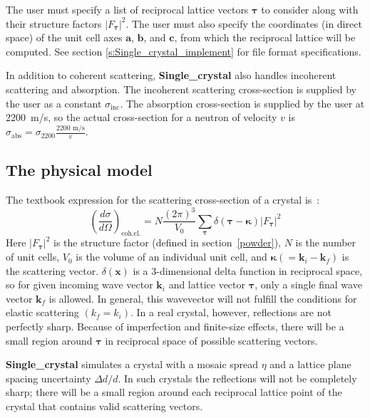 The user must specify a list of reciprocal lattice vectors
$\boldsymbol{\tau}$ to consider along with their structure factors
$|F_{\boldsymbol{\tau}}|^2$. The user must also specify the coordinates
(in direct space) of the unit cell axes $\boldsymbol{a}$,
$\boldsymbol{b}$, and $\boldsymbol{c}$, from which the reciprocal lattice
will be computed. See section \ref{s:Single_crystal_implement} for file format specifications.

In addition to coherent scattering, \textbf{Single\_crystal} also
handles incoherent scattering and absorption. The incoherent scattering
cross-section is supplied by the user as a constant
$\sigma_\textrm{inc}$. The absorption cross-section is supplied by the user at
2200~m/s, so the actual cross-section for a neutron of velocity $v$ is
$\sigma_\textrm{abs} = \sigma_{2200} \frac{\textrm{2200~m/s}}{v}$.

\subsection{The physical model}

The textbook expression for the scattering cross-section of a crystal
is~\cite[ch.3]{squires}:
\begin{equation}
\label{eq:sigma_coh_el}
\left(\frac{d\sigma}{d\Omega}\right)_\textrm{coh.el.} =
        N\frac{(2\pi)^3}{V_0}\sum_{\boldsymbol{\tau}}
        \delta(\boldsymbol{\tau} - \boldsymbol{\kappa})|F_{\boldsymbol{\tau}}|^2
\end{equation}
Here $|F_{\boldsymbol{\tau}}|^2$ is the structure factor
(defined in section~\ref{powder}), $N$ is the
number of unit cells, $V_0$ is the volume of an
individual unit cell, and $\boldsymbol{\kappa} (= \textbf{k}_i - \textbf{k}_f)$
is the scattering vector. $\delta(\boldsymbol{x})$ is a 3-dimensional delta
function in reciprocal space,
so for given incoming wave vector $\textbf{k}_i$ and lattice vector
${\boldsymbol{\tau}}$, only a single final wave vector $\textbf{k}_f$ is allowed.
In general, this wavevector will not fulfill the conditions for elastic
scattering $(k_f = k_i)$.
In a real crystal, however, reflections are not perfectly sharp. Because
of imperfection and finite-size effects, there will be a small region
around $\boldsymbol{\tau}$ in reciprocal space of possible scattering vectors.

\textbf{Single\_crystal} simulates a crystal with a mosaic spread
$\eta$ and a lattice plane spacing uncertainty $\Delta d/d$. In such
crystals the reflections will not be completely sharp;
there will be a small region around each reciprocal lattice point of the
crystal that contains valid scattering vectors.

